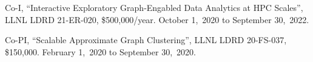 \item Co-I,
        ``Interactive Exploratory Graph-Engabled Data Analytics at HPC Scales'',
        LLNL LDRD 21-ER-020,
        \$500,000/year.
        October 1,~2020 to September 30,~2022.

\item Co-PI,
	``Scalable Approximate Graph Clustering'',
	LLNL LDRD 20-FS-037,
	\$150,000.
	February 1,~2020 to September 30,~2020.
